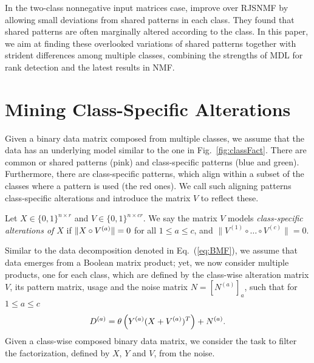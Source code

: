 In the two-class nonnegative input matrices case, \cite{kim2015simultaneous} improve over RJSNMF by allowing small deviations from shared patterns in each class. They found that shared patterns are often marginally altered according to the class. In this paper, we aim at finding these overlooked variations of shared patterns together with strident differences among multiple classes, combining the strengths of MDL for rank detection and the latest results in NMF.
\section{Mining Class-Specific Alterations}
Given a binary data matrix composed from multiple classes, we assume that the data has an underlying model similar to the one in Fig.~\ref{fig:classFact}. There are common or shared patterns (pink) and class-specific patterns (blue and green). Furthermore, there are class-specific patterns, which align within a subset of the classes where a pattern is used (the red ones). We call such aligning patterns class-specific alterations and introduce the matrix $V$ to reflect these.
\begin{definition}\label{def:cs:classSpecAlt}
Let $X\in\{0,1\}^{n\times r}$ and $V\in \{0,1\}^{n\times cr}$.
We say the matrix $V$ models \emph{class-specific alterations of $X$} if $\|X\circ V^{(a)}\|=0$ for all $1\leq a\leq c$, and $\|V^{(1)}\circ\ldots\circ V^{(c)}\|=0$.
\end{definition}
Similar to the data decomposition denoted in Eq.~(\ref{eq:BMF}), we assume that data emerges from a Boolean matrix product; yet, we now consider multiple products, one for each class, which are defined by the class-wise alteration matrix $V$, its pattern matrix, usage and the noise matrix $N=[N^{(a)}]_a$, such that for $1\leq a\leq c$
\begin{align}\label{eq:VBMF}
D^{(a)}= \theta\left(Y^{(a)}(X+V^{(a)})^T\right) +N^{(a)}.
\end{align}
Given a class-wise composed binary data matrix, we consider the task to filter the factorization, defined by $X$, $Y$ and $V$, from the noise.
